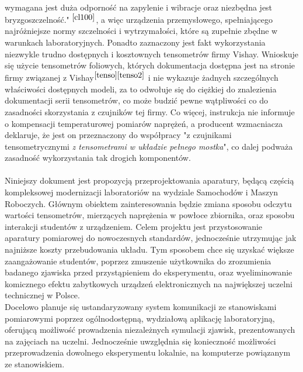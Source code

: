 \documentclass[12pt]{article}
\begin{document}
	wymagana jest duża odporność na zapylenie i wibracje oraz niezbędna jest bryzgoszczelność." $^{\cite{cl100}}$, a więc urządzenia przemysłowego, spełniającego najróżniejsze normy szczelności i wytrzymałości, które są zupełnie zbędne w warunkach laboratoryjnych. Ponadto zaznaczony jest fakt wykorzystania niezwykle trudno dostępnych i kosztownych tensometrów firmy Vishay. Wnioskuje się użycie tensometrów foliowych, których dokumentacja dostępna jest na stronie firmy związanej z Vishay$^{\cite{tenso}\cite{tenso2}}$ i nie wykazuje żadnych szczególnych właściwości dostępnych modeli, za to odwołuje się do ciężkiej do znalezienia dokumentacji serii tensometrów, co może budzić pewne wątpliwości co do zasadności skorzystania z czujników tej firmy. Co więcej, instrukcja nie informuje o kompensacji temperaturowej pomiarów naprężeń, a producent wzmacniacza deklaruje, że jest on przeznaczony do współpracy "z czujnikami tensometrycznymi \textit{z tensometrami w układzie pełnego mostka}", co dalej podważa zasadność wykorzystania tak drogich komponentów.\\\\
	Niniejszy dokument jest propozycją przeprojektowania aparatury, będącą częścią kompleksowej modernizacji laboratoriów na wydziale Samochodów i Maszyn Roboczych. Głównym obiektem zainteresowania będzie zmiana sposobu odczytu wartości tensometrów, mierzących naprężenia w powłoce zbiornika, oraz sposobu interakcji studentów z urządzeniem. Celem projektu jest przystosowanie aparatury pomiarowej do nowoczesnych standardów, jednocześnie utrzymując jak najniższe koszty przebudowania układu. Tym sposobem chce się uzyskać większe zaangażowanie studentów, poprzez zmuszenie użytkownika do zrozumienia badanego zjawiska przed przystąpieniem do eksperymentu, oraz wyeliminowanie komicznego efektu zabytkowych urządzeń elektronicznych na największej uczelni technicznej w Polsce.\\ Docelowo planuje się ustandaryzowany system komunikacji ze stanowiskami pomiarowymi poprzez ogólnodostępną, wydziałową aplikację laboratoryjną, oferującą możliwość prowadzenia niezależnych symulacji zjawisk, prezentowanych na zajęciach na uczelni. Jednocześnie uwzględnia się konieczność możliwości przeprowadzenia dowolnego eksperymentu lokalnie, na komputerze powiązanym ze stanowiskiem.
	
\end{document}
